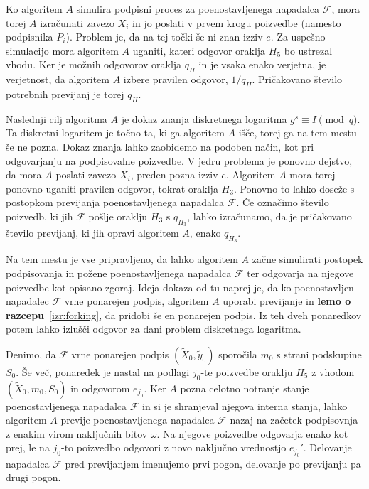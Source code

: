 \begin{dokaz}
Ko algoritem $A$ simulira podpisni proces za poenostavljenega napadalca $\mathcal{F}$, mora torej
$A$ izračunati zavezo $X_i$ in jo poslati v prvem krogu poizvedbe (namesto podpisnika $P_i$). Problem
je, da na tej točki še ni znan izziv $e$. Za uspešno simulacijo mora algoritem $A$ uganiti, kateri
odgovor oraklja $H_5$ bo ustrezal vhodu. Ker je možnih odgovorov oraklja $q_H$ in je vsaka enako
verjetna, je verjetnost, da algoritem $A$ izbere pravilen odgovor, $1/q_H$. Pričakovano število
potrebnih previjanj je torej $q_H$.

Naslednji cilj algoritma $A$ je dokaz znanja diskretnega logaritma $g^s \equiv I \pmod q$. Ta
diskretni logaritem je točno ta, ki ga algoritem $A$ išče, torej ga na tem mestu še ne pozna. Dokaz
znanja lahko zaobidemo na podoben način, kot pri odgovarjanju na podpisovalne poizvedbe. V jedru
problema je ponovno dejstvo, da mora $A$ poslati zavezo $X_i$, preden pozna izziv $e$. Algoritem $A$
mora torej ponovno uganiti pravilen odgovor, tokrat oraklja $H_3$. Ponovno to lahko doseže s postopkom
previjanja poenostavljenega napadalca $\mathcal{F}$. Če označimo število poizvedb, ki jih $\mathcal{F}$
pošlje oraklju $H_3$ s $q_{H_3}$, lahko izračunamo, da je pričakovano število previjanj, ki jih opravi
algoritem $A$, enako $q_{H_3}$.

Na tem mestu je vse pripravljeno, da lahko algoritem $A$ začne simulirati postopek podpisovanja in
požene poenostavljenega napadalca $\mathcal{F}$ ter odgovarja na njegove poizvedbe kot opisano zgoraj.
Ideja dokaza od tu naprej je, da ko poenostavljen napadalec $\mathcal{F}$ vrne ponarejen podpis,
algoritem $A$ uporabi previjanje in \textbf{lemo o razcepu}~\ref{izr:forking}, da pridobi še en
ponarejen podpis. Iz teh dveh ponaredkov potem lahko izlušči odgovor za dani problem diskretnega
logaritma.

Denimo, da $\mathcal{F}$ vrne ponarejen podpis $(\tilde{X}_0, \tilde{y}_0)$ sporočila $m_0$ s strani
podskupine $S_0$. Še več, ponaredek je nastal na podlagi $j_0$-te poizvedbe oraklju $H_5$ z vhodom
$(\tilde{X}_0, m_0, S_0)$ in odgovorom $e_{j_0}$. Ker $A$ pozna celotno notranje stanje poenostavljenega
napadalca $\mathcal{F}$ in si je shranjeval njegova interna stanja, lahko algoritem $A$ previje
poenostavljenega napadalca $\mathcal{F}$ nazaj na začetek podpisovnja z enakim virom naključnih bitov
$\omega$. Na njegove poizvedbe odgovarja enako kot prej, le na $j_0$-to poizvedbo odgovori z novo
naključno vrednostjo $e_{j_0}'$. Delovanje napadalca $\mathcal{F}$ pred previjanjem imenujemo prvi
pogon, delovanje po previjanju pa drugi pogon.


\end{dokaz}
